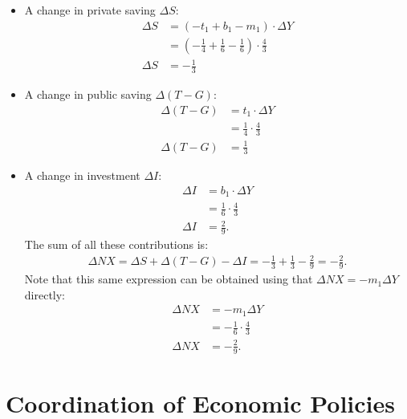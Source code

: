 \documentclass[]{book}
\providecommand{\tightlist}{%
  \setlength{\itemsep}{0pt}\setlength{\parskip}{0pt}}
\begin{document}
\begin{itemize}
\tightlist
\item
  A change in private saving \(\Delta S\): \[
  \begin{aligned}
  \Delta S &= (-t_1+b_1-m_1) \cdot \Delta Y\\
  &=\left(-\frac{1}{4} + \frac{1}{6} - \frac{1}{6}\right) \cdot \frac{4}{3}\\
  \Delta S &=-\frac{1}{3}
  \end{aligned}
  \]
\item
  A change in public saving \(\Delta (T-G)\): \[
  \begin{aligned}
  \Delta (T-G) &= t_1 \cdot \Delta Y\\
  &=\frac{1}{4} \cdot \frac{4}{3}\\
  \Delta (T-G) &=\frac{1}{3}
  \end{aligned}
  \]
\item
  A change in investment \(\Delta I\): \[
  \begin{aligned}
  \Delta I &= b_1 \cdot \Delta Y\\
  &=\frac{1}{6} \cdot \frac{4}{3}\\
  \Delta I &=\frac{2}{9}.
  \end{aligned}
  \] The sum of all these contributions is: \[
  \begin{aligned}
  \boxed{\Delta NX=\Delta S + \Delta (T-G)-\Delta I=-\frac{1}{3}+\frac{1}{3}-\frac{2}{9}=-\frac{2}{9}}.
  \end{aligned}
  \] Note that this same expression can be obtained using that
  \(\Delta NX = -m_1 \Delta Y\) directly: \[
  \begin{aligned}
  \Delta NX&=-m_1 \Delta Y\\
  &=-\frac{1}{6} \cdot \frac{4}{3} \\
  \Delta NX&=-\frac{2}{9}.
  \end{aligned}
  \]
\end{itemize}

\section{Coordination of Economic
Policies}\label{coordination-of-economic-policies-1}
\end{document}
